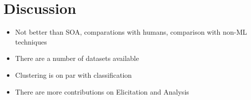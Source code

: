 \section{Discussion}

\begin{itemize}
  \item Not better than SOA, comparations with humans, comparison with non-ML
  techniques
  \item There are a number of datasets available
  \item Clustering is on par with classification
  \item There are more contributions on Elicitation and Analysis
\end{itemize}



